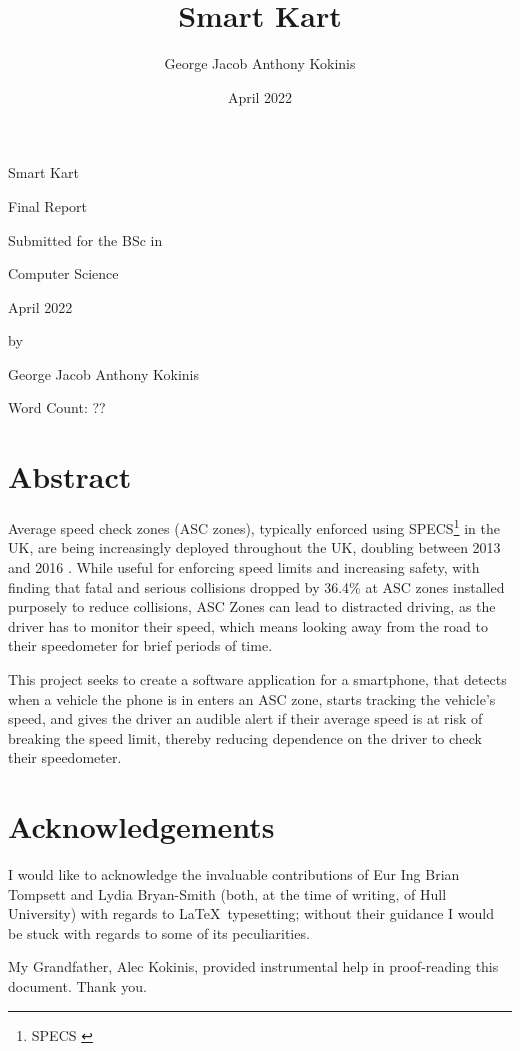 \documentclass[11pt, a4paper, notitlepage]{report}
\title{Smart Kart}
\date{April 2022}
\author{George Jacob Anthony Kokinis}
\begin{document}
\begin{center}
	{\Huge Smart Kart}
	
	\bigskip
	{\Large Final Report}
	
	\bigskip
	Submitted for the BSc in
	
	\bigskip
	{\LARGE Computer Science}
	
	\bigskip
	April 2022
	
	\bigskip
	by 
	
	\bigskip
	{\LARGE George Jacob Anthony Kokinis}
    
    \bigskip
    Word Count: ?? %
\end{center}
\newpage
\section{Abstract}
Average speed check zones (ASC zones), typically enforced using SPECS\footnote{SPECS \citep{specsjenop}} in the UK, are being increasingly deployed throughout the UK, doubling between 2013 and 2016 \citep{BBCSpeedCameraDoubled}. While useful for enforcing speed limits and increasing safety, with \citet{owenAllsop} finding that fatal and serious collisions dropped by 36.4\% at ASC zones installed purposely to reduce collisions, ASC Zones can lead to distracted driving, as the driver has to monitor their speed, which means looking away from the road to their speedometer for brief periods of time.

This project seeks to create a software application for a smartphone, that detects when a vehicle the phone is in enters an ASC zone, starts tracking the vehicle's speed, and gives the driver an audible alert if their average speed is at risk of breaking the speed limit, thereby reducing dependence on the driver to check their speedometer.

\section{Acknowledgements}
I would like to acknowledge the invaluable contributions of Eur Ing Brian Tompsett and Lydia Bryan-Smith (both, at the time of writing, of Hull University) with regards to \LaTeX\ typesetting; without their guidance I would be stuck with regards to some of its peculiarities.

My Grandfather, Alec Kokinis, provided instrumental help in proof-reading this document. Thank you.
\end{document}

